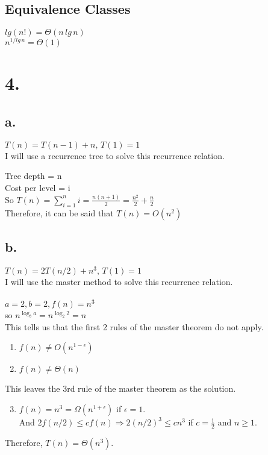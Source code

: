 \documentclass[12pt]{article}
\begin{document}
\subsection*{Equivalence Classes}
$lg(n!) = \Theta(n\,lg\,n)$\\
$n^{1/lg\,n} = \Theta(1)$

\section*{4.}
\subsection*{a.} $T(n) = T(n-1)+n,\,T(1) = 1$\\
I will use a recurrence tree to solve this recurrence relation.\\
\begin{center}
\end{center}
Tree depth = n\\
Cost per level = i\\
So $T(n) = \sum_{i = 1}^{n} i = \frac{n(n+1)}{2} = \frac{n^2}{2} + \frac{n}{2}$\\
Therefore, it can be said that $T(n) =  O(n^2)$\\
\subsection*{b.} $T(n) = 2T(n/2)+n^3,\,T(1) = 1$\\
I will use the master method to solve this recurrence relation.\\
\\
$a=2, b=2, f(n)=n^3$\\
so $n^{\log_{b} a} = n^{\log_{2} 2} = n$\\
This tells us that the first 2 rules of the master theorem do not apply.
\begin{enumerate}
\item $f(n) \ne O(n^{1-\epsilon})$
\item $f(n) \ne \Theta{(n)}$
\end{enumerate}
This leaves the 3rd rule of the master theorem as the solution.\\
\begin{enumerate}
\setcounter{enumi}{2}
\item $f(n) = n^3 = \Omega{(n^{1+\epsilon})}$ if $\epsilon = 1$. \\ 
And $2f(n/2) \le cf(n) \Rightarrow 2(n/2)^3 \le cn^3$ if $c=\frac{1}{2}$ and $n \ge 1$.\\
\end{enumerate}
Therefore, $T(n) = \Theta{(n^3)}$.
\end{document}
